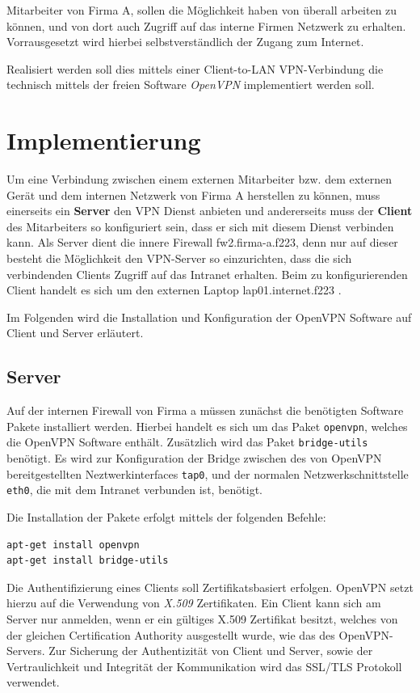 Mitarbeiter von Firma A, sollen die Möglichkeit haben von überall arbeiten zu können, und von dort auch Zugriff auf das interne Firmen Netzwerk zu erhalten.
Vorrausgesetzt wird hierbei selbstverständlich der Zugang zum Internet.

Realisiert werden soll dies mittels einer Client-to-LAN VPN-Verbindung die technisch mittels der freien Software \emph{OpenVPN} implementiert werden soll.

\section{Implementierung}

Um eine Verbindung zwischen einem externen Mitarbeiter bzw. dem externen Gerät und dem internen Netzwerk von Firma A herstellen zu können, muss einerseits ein \textbf{Server} den VPN Dienst anbieten und andererseits muss der \textbf{Client} des Mitarbeiters so konfiguriert sein, dass er sich mit diesem Dienst verbinden kann.
Als Server dient die innere Firewall fw2.firma-a.f223, denn nur auf dieser besteht die Möglichkeit den VPN-Server so einzurichten, dass die sich verbindenden Clients Zugriff auf das Intranet erhalten.
Beim zu konfigurierenden Client handelt es sich um den externen Laptop lap01.internet.f223 \cite{Neuschwander2014}.

Im Folgenden wird die Installation und Konfiguration der OpenVPN Software auf Client und Server erläutert.


\subsection{Server}\label{vpn:server}

Auf der internen Firewall von Firma a müssen zunächst die benötigten Software Pakete installiert werden. Hierbei handelt es sich um das Paket \texttt{openvpn}, welches die OpenVPN Software enthält. Zusätzlich wird das Paket \texttt{bridge-utils} benötigt.
Es wird zur Konfiguration der Bridge zwischen des von OpenVPN bereitgestellten Neztwerkinterfaces \texttt{tap0}, und der normalen Netzwerkschnittstelle \texttt{eth0}, die mit dem Intranet verbunden ist, benötigt.

Die Installation der Pakete erfolgt mittels der folgenden Befehle:

\begin{lstlisting}
apt-get install openvpn
apt-get install bridge-utils
\end{lstlisting}

Die Authentifizierung eines Clients soll Zertifikatsbasiert erfolgen. OpenVPN setzt hierzu auf die Verwendung von \emph{X.509} Zertifikaten. Ein Client kann sich am Server nur anmelden, wenn er ein gültiges X.509 Zertifikat besitzt, welches von der gleichen Certification Authority ausgestellt wurde, wie das des OpenVPN-Servers. Zur Sicherung der Authentizität von Client und Server, sowie der Vertraulichkeit und Integrität der Kommunikation wird das SSL/TLS Protokoll verwendet. 

